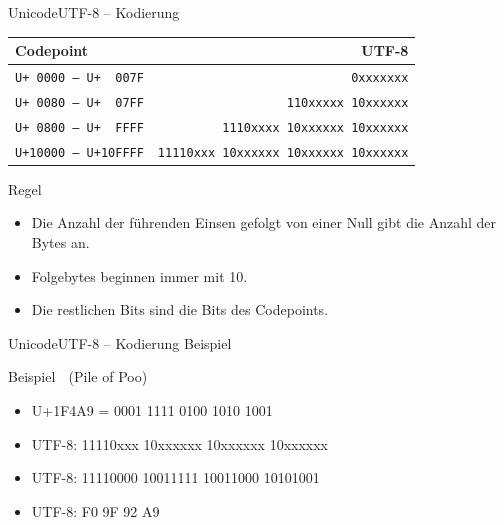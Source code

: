 \documentclass[xelatex,aspectratio=169]{beamer}
\begin{document}
\begin{frame}{Unicode}{UTF-8 -- Kodierung}
    \begin{center}
        \begin{tabular}{lr}
            \toprule
            \textbf{Codepoint}           & \textbf{UTF-8}                               \\
            \midrule
            \texttt{U+~0000 -- U+~~007F} & \texttt{0xxxxxxx}                            \\
            \texttt{U+~0080 -- U+~~07FF} & \texttt{110xxxxx 10xxxxxx}                   \\
            \texttt{U+~0800 -- U+~~FFFF} & \texttt{1110xxxx 10xxxxxx 10xxxxxx}          \\
            \texttt{U+10000 -- U+10FFFF} & \texttt{11110xxx 10xxxxxx 10xxxxxx 10xxxxxx} \\
            \bottomrule
        \end{tabular}
    \end{center}
    \begin{block}{Regel}
        \begin{itemize}
            \item Die Anzahl der führenden Einsen gefolgt von einer Null gibt die Anzahl der Bytes an.
            \item Folgebytes beginnen immer mit 10.
            \item Die restlichen Bits sind die Bits des Codepoints.
        \end{itemize}

    \end{block}
\end{frame}
\begin{frame}{Unicode}{UTF-8 -- Kodierung Beispiel}
    \begin{exampleblock}{Beispiel {\symbolfont 💩} (Pile of Poo)}
        \begin{itemize}
            \item U+1F4A9 = 0001 1111 0100 1010 1001
            \item UTF-8: 11110xxx 10xxxxxx 10xxxxxx 10xxxxxx
            \item UTF-8: 11110000 10011111 10011000 10101001
            \item UTF-8: F0 9F 92 A9
        \end{itemize}
    \end{exampleblock}
\end{frame}
\end{document}
